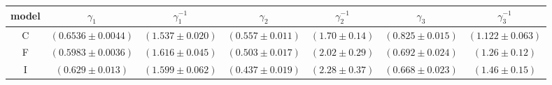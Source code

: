 \begin{tabular}{ccccccc}
\toprule
model & $\gamma_1$ & $\gamma_1^{-1}$ & $\gamma_2$ & $\gamma_2^{-1}$ & $\gamma_3$ & $\gamma_3^{-1}$ \\
\midrule
C & $ (0.6536\pm0.0044) $ & $ (1.537\pm0.020) $ & $ (0.557\pm0.011) $ & $ (1.70\pm0.14) $ & $ (0.825\pm0.015) $ & $ (1.122\pm0.063) $ \\
F & $ (0.5983\pm0.0036) $ & $ (1.616\pm0.045) $ & $ (0.503\pm0.017) $ & $ (2.02\pm0.29) $ & $ (0.692\pm0.024) $ & $ (1.26\pm0.12) $ \\
I & $ (0.629\pm0.013) $ & $ (1.599\pm0.062) $ & $ (0.437\pm0.019) $ & $ (2.28\pm0.37) $ & $ (0.668\pm0.023) $ & $ (1.46\pm0.15) $ \\
\bottomrule
\end{tabular}
